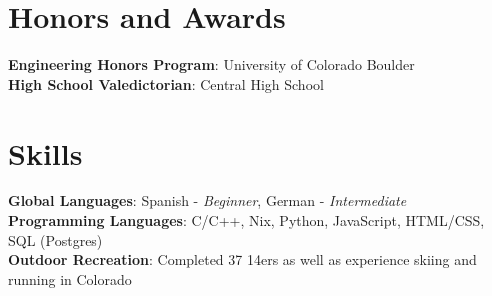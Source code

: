 \documentclass[letterpaper,11pt]{article}
\begin{document}
 \section{Honors and Awards}
 \begin{itemize}[leftmargin=0.15in, label={}]
    \small{\item{
     \textbf{Engineering Honors Program}{: University of Colorado Boulder}\\
     \textbf{High School Valedictorian}{: Central High School}
     \textbf{}
    }}
 \end{itemize}
 
\section{Skills}
 \begin{itemize}[leftmargin=0.15in, label={}]
    \small{\item{
     \textbf{Global Languages}{: Spanish - \textit{Beginner}, German - \textit{Intermediate}} \\
     \textbf{Programming Languages}{: C/C++, Nix, Python, JavaScript, HTML/CSS, SQL (Postgres)} \\
     \textbf{Outdoor Recreation}{: Completed 37 14ers as well as experience skiing and running in Colorado}
    }}
 \end{itemize}
 
\end{document}
